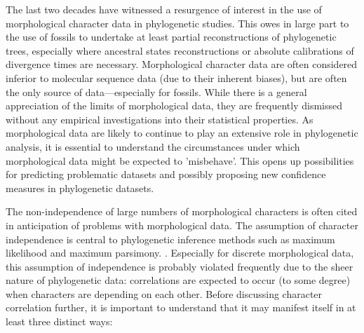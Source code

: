 \documentclass[12pt,letterpaper]{article}
\begin{document}
The last two decades have witnessed a resurgence of interest in the use of morphological character data in phylogenetic studies.
This owes in large part to the use of fossils to undertake at least partial reconstructions of phylogenetic trees, especially where ancestral states reconstructions or absolute calibrations of divergence times are necessary. 
Morphological character data are often considered inferior to molecular sequence data (due to their inherent biases), but are often the only source of data---especially for fossils.
While there is a general appreciation of the limits of morphological data, they are frequently dismissed without any empirical investigations into their statistical properties.
As morphological data are likely to continue to play an extensive role in phylogenetic analysis, it is essential to understand the circumstances under which morphological data might be expected to 'misbehave'.
This opens up possibilities for predicting problematic datasets and possibly proposing new confidence measures in phylogenetic datasets.

The non-independence of large numbers of morphological characters is often cited in anticipation of problems with morphological data.
The assumption of character independence is central to phylogenetic inference methods such as maximum likelihood and maximum parsimony. \citep[e.g.][]{joysey1982problems,felsenstein1985phylogenies,lewisa2001,felsenstein2004inferring}.
Especially for discrete morphological data, this assumption of independence is probably violated frequently due to the sheer nature of phylogenetic data: correlations are expected to occur (to some degree) when characters are depending on each other.
Before discussing character correlation further, it is important to understand that it may manifest itself in at least three distinct ways:
\end{document}
